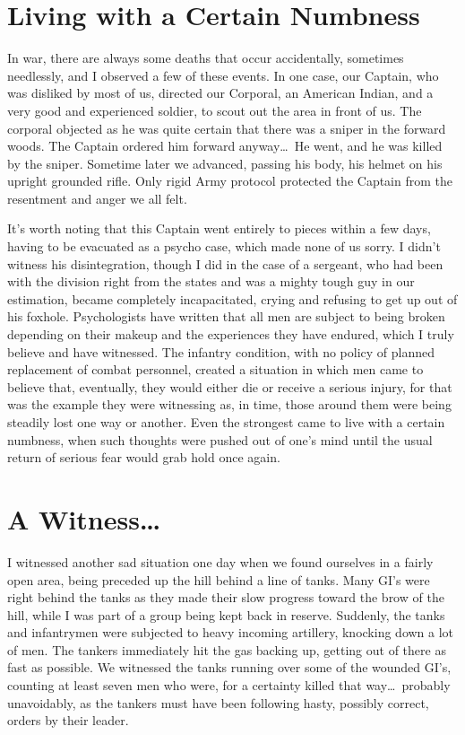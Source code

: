 \documentclass[../m3y]{subfiles}
\begin{document}
\section{Living with a Certain Numbness}
In war, there are always some deaths that occur accidentally, sometimes needlessly, and I observed a few of these events. In one case, our Captain, who was disliked by most of us, directed our Corporal, an American Indian, and a very good and experienced soldier, to scout out the area in front of us. The corporal objected as he was quite certain that there was a sniper in the forward woods. The Captain ordered him forward anyway\ldots\ He went, and he was killed by the sniper. Sometime later we advanced, passing his body, his helmet on his upright grounded rifle. Only rigid Army protocol protected the Captain from the resentment and anger we all felt.

It's worth noting that this Captain went entirely to pieces within a few days, having to be evacuated as a psycho case, which made none of us sorry. I didn't witness his disintegration, though I did in the case of a sergeant, who had been with the division right from the states and was a mighty tough guy in our estimation, became completely incapacitated, crying and refusing to get up out of his foxhole. Psychologists have written that all men are subject to being broken depending on their makeup and the experiences they have endured, which I truly believe and have witnessed. The infantry condition, with no policy of planned replacement of combat personnel, created a situation in which men came to believe that, eventually, they would either die or receive a serious injury, for that was the example they were witnessing as, in time, those around them were being steadily lost one way or another. Even the strongest came to live with a certain numbness, when such thoughts were pushed out of one's mind until the usual return of serious fear would grab hold once again.

\section{A Witness\ldots}
I witnessed another sad situation one day when we found ourselves in a fairly open area, being preceded up the hill behind a line of tanks. Many GI's were right behind the tanks as they made their slow progress toward the brow of the hill, while I was part of a group being kept back in reserve. Suddenly, the tanks and infantrymen were subjected to heavy incoming artillery, knocking down a lot of men. The tankers immediately hit the gas backing up, getting out of there as fast as possible. We witnessed the tanks running over some of the wounded GI's, counting at least seven men who were, for a certainty killed that way\ldots\ probably unavoidably, as the tankers must have been following hasty, possibly correct, orders by their leader.
\end{document}
